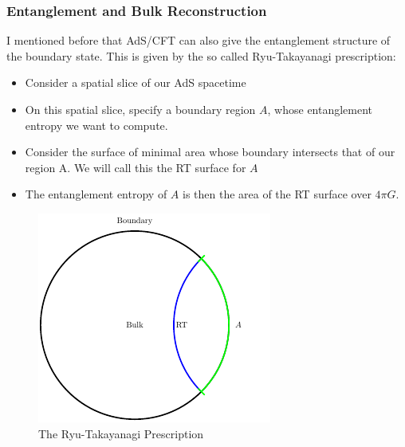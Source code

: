 \documentclass[8pt,aspectratio=169]{beamer}
\begin{document}
\begin{frame}
\frametitle{Entanglement and Bulk Reconstruction}

I mentioned before that AdS/CFT can also give the entanglement structure of the boundary state. This is given by the so called Ryu-Takayanagi prescription: 

\begin{minipage}[t]{0.55\linewidth}

\begin{itemize}

\item Consider a spatial slice of our AdS spacetime

\item On this spatial slice, specify a boundary region $A$, whose entanglement entropy we want to compute. 

\item Consider the surface of minimal area whose boundary intersects that of our region A. We will call this the RT surface for $A$

\item The entanglement entropy of $A$ is then the area of the RT surface over $4\pi G$.

\end{itemize}

\end{minipage}\hfill
%
\begin{minipage}[t]{0.44\linewidth}

\begin{figure}
    \begin{center}
    
        \includegraphics[scale=1]{RT}    
    
    \end{center}
    \caption{The Ryu-Takayanagi Prescription}
    \label{fig:WDW}
\end{figure}

\end{minipage}

\end{frame}
\end{document}
